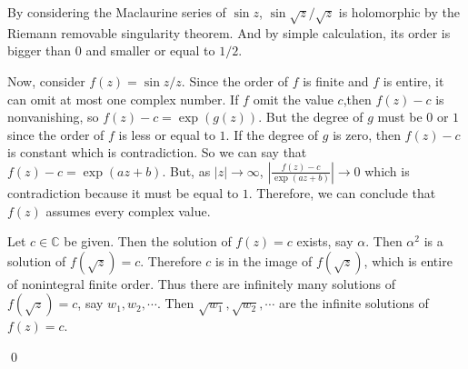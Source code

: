 \begin{problem}[9.5] \hfill

	By considering the Maclaurine series of $\sin z$, $\sin \sqrt{z} / \sqrt{z}$ is holomorphic by the Riemann removable singularity theorem.
	And by simple calculation, its order is bigger than $0$ and smaller or equal to $1/2$.

	Now, consider $f(z) = \sin z / z$. Since the order of $f$ is finite and $f$ is entire, it can omit at most one complex number.
	If $f$ omit the value $c$,then $f(z) -c$ is nonvanishing, so $f(z) - c = \exp (g(z))$.
	But the degree of $g$ must be $0$ or $1$ since the order of $f$ is less or equal to $1$.
	If the degree of $g$ is zero, then $f(z) - c$ is constant which is contradiction.
	So we can say that $f(z) - c = \exp(az+b)$.
	But, as $|z| \rightarrow \infty$, $\left | \frac{f(z) - c}{\exp(az+b)} \right | \rightarrow 0$ which is contradiction because it must be equal to $1$.
	Therefore, we can conclude that $f(z)$ assumes every complex value.

	Let $c\in \mathbb{C}$ be given. Then the solution of $f(z) = c$ exists, say $\alpha$. Then $\alpha^2$ is a solution of $f(\sqrt z) = c$.
	Therefore $c$ is in the image of $f(\sqrt{z})$, which is entire of nonintegral finite order.
	Thus there are infinitely many solutions of $f(\sqrt{z}) = c$, say $w_1, w_2, \cdots$.
	Then $\sqrt{w_1}, \sqrt{w_2}, \cdots$ are the infinite solutions of $f(z) = c$.

	\qed
	
\end{problem}

